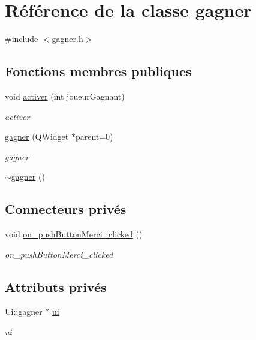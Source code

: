 \hypertarget{classgagner}{\section{Référence de la classe gagner}
\label{classgagner}
}


{\ttfamily \#include $<$gagner.\-h$>$}

\subsection*{Fonctions membres publiques}
\begin{DoxyCompactItemize}
\item 
void \hyperlink{classgagner_ae397abfcf09f7e766e1661c99fa49a0c}{activer} (int joueur\-Gagnant)
\begin{DoxyCompactList}\small\item\em activer \end{DoxyCompactList}\item 
\hyperlink{classgagner_abc8402423bce58b946b41611aa3da818}{gagner} (Q\-Widget $\ast$parent=0)
\begin{DoxyCompactList}\small\item\em gagner \end{DoxyCompactList}\item 
\hyperlink{classgagner_a0a6a039c21efde6226f775caa40308e2}{$\sim$gagner} ()
\end{DoxyCompactItemize}
\subsection*{Connecteurs privés}
\begin{DoxyCompactItemize}
\item 
void \hyperlink{classgagner_ace76d831ed95d4402be08bf9473081d3}{on\-\_\-push\-Button\-Merci\-\_\-clicked} ()
\begin{DoxyCompactList}\small\item\em on\-\_\-push\-Button\-Merci\-\_\-clicked \end{DoxyCompactList}\end{DoxyCompactItemize}
\subsection*{Attributs privés}
\begin{DoxyCompactItemize}
\item 
Ui\-::gagner $\ast$ \hyperlink{classgagner_a4b1df163878c34bff176f83bf01d1c26}{ui}
\begin{DoxyCompactList}\small\item\em ui \end{DoxyCompactList}\end{DoxyCompactItemize}


